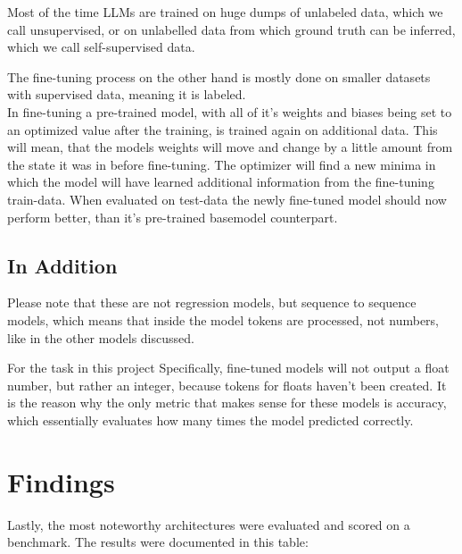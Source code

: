 \documentclass{article}
\begin{document}
Most of the time LLMs are trained on huge dumps of unlabeled data, which 
we call unsupervised, or on unlabelled data from which ground truth can be 
inferred, which we call self-supervised data. 

The fine-tuning process on the other hand is mostly done on smaller datasets 
with supervised data, meaning it is labeled.
\\[2em]
In fine-tuning a pre-trained model, with all of it's weights and biases being 
set to an optimized value after the training, is trained again on additional 
data. This will mean, that the models weights will move and change by a little 
amount from the state it was in before fine-tuning. The optimizer will find a 
new minima in which the model will have learned additional information from the 
fine-tuning train-data. When evaluated on test-data the newly fine-tuned model 
should now perform better, than it's pre-trained basemodel counterpart.

\subsection{In Addition}
Please note that these are not regression models, but sequence to sequence 
models, which means that inside the model tokens are processed, not numbers, 
like in the other models discussed. 

For the task in this project Specifically, fine-tuned models will not output a 
float number, but rather an integer, because tokens for floats haven't been 
created. It is the reason why the only metric that makes sense for these models 
is accuracy, which essentially evaluates how many times the model predicted 
correctly.

\newpage

\section{Findings}

Lastly, the most noteworthy architectures were evaluated and scored on a 
benchmark. The results were documented in this table: 
\\[0.5em]
\end{document}
